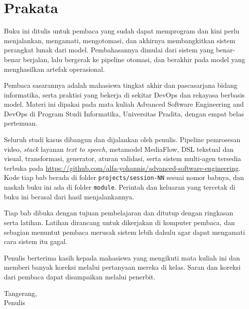 \chapter{Prakata}

Buku ini ditulis untuk pembaca yang sudah dapat memprogram dan kini perlu menjalankan, mengamati, mengotomasi, dan akhirnya membangkitkan sistem perangkat lunak dari model. Pembahasannya dimulai dari sistem yang benar-benar berjalan, lalu bergerak ke pipeline otomasi, dan berakhir pada model yang menghasilkan artefak operasional.

Pembaca sasarannya adalah mahasiswa tingkat akhir dan pascasarjana bidang informatika, serta praktisi yang bekerja di sekitar DevOps dan rekayasa berbasis model. Materi ini dipakai pada mata kuliah Advanced Software Engineering and DevOps di Program Studi Informatika, Universitas Pradita, dengan empat belas pertemuan.

Seluruh studi kasus dibangun dan dijalankan oleh penulis. Pipeline pemrosesan video, \textit{stack} layanan \textit{text to speech}, metamodel MediaFlow, DSL tekstual dan visual, transformasi, generator, aturan validasi, serta sistem multi-agen tersedia terbuka pada \url{https://github.com/alfa-yohannis/advanced-software-engineering}. Kode tiap bab berada di folder \texttt{projects/session-NN} sesuai nomor babnya, dan naskah buku ini ada di folder \texttt{module}. Perintah dan keluaran yang tercetak di buku ini berasal dari hasil menjalankannya.

Tiap bab dibuka dengan tujuan pembelajaran dan ditutup dengan ringkasan serta latihan. Latihan dirancang untuk dikerjakan di komputer pembaca, dan sebagian menuntut pembaca merusak sistem lebih dahulu agar dapat mengamati cara sistem itu gagal.

Penulis berterima kasih kepada mahasiswa yang mengikuti mata kuliah ini dan memberi banyak koreksi melalui pertanyaan mereka di kelas. Saran dan koreksi dari pembaca dapat disampaikan melalui penerbit.

\bigskip
\begin{flushright}
Tangerang, \\[4pt]
Penulis
\end{flushright}
